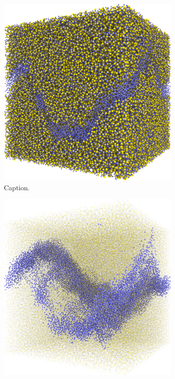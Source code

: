 %
\begin{figure}[htpb]%
    \centering%
    \setlength{\myfigwidth}{0.49\textwidth}%
%
    \begin{subfigure}[b]{\myfigwidth}%
        \centering%
        \includegraphics[width=\textwidth]{images/systems/trimmed-rough_fracture04_06}%
        \caption{Caption.}%
    \end{subfigure}%
    \hfill%
    \begin{subfigure}[b]{\myfigwidth}%
        \centering%
        \includegraphics[width=\textwidth]{images/systems/trimmed-rough_fracture04_07}%

\end{subfigure}
\end{figure}
